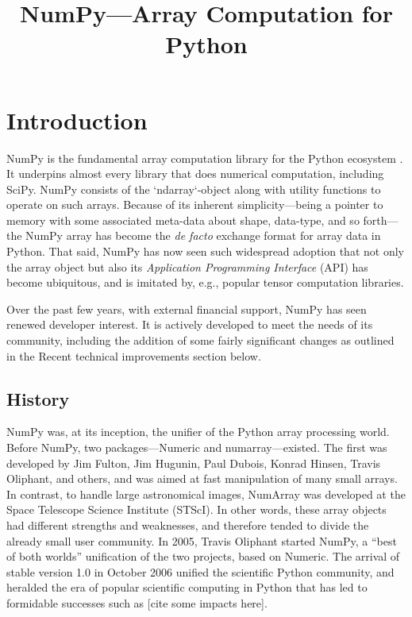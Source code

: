 \documentclass[fleqn,10pt]{wlscirep}
\title{NumPy---Array Computation for Python}
\begin{document}
\flushbottom
\maketitle
\thispagestyle{empty}



\section*{Introduction}

NumPy is the fundamental array computation library for the Python
ecosystem \cite{dubois2007guest,oliphant2007python,millman2011python,perez2011python}.
It underpins almost every library that does numerical
computation, including SciPy.  NumPy consists of the `ndarray`-object
along with utility functions to operate on such arrays.  Because of
its inherent simplicity—being a pointer to memory with some
associated meta-data about shape, data-type, and so forth—the NumPy
array has become the {\it de facto} exchange format for array data in
Python.  That said, NumPy has now seen such widespread adoption that
not only the array object but also its {\it Application Programming
  Interface} (API) has become ubiquitous, and is imitated by, e.g.,
popular tensor computation libraries.

Over the past few years, with external financial support, NumPy has
seen renewed developer interest.  It is actively developed to meet the
needs of its community, including the addition of some fairly significant
changes as outlined in the Recent technical improvements section below.

\subsection*{History}

NumPy was, at its inception, the unifier of the Python array
processing world.  Before NumPy, two packages—Numeric and
numarray—existed.  The first was developed by Jim Fulton, Jim Hugunin, Paul Dubois, Konrad
Hinsen, Travis Oliphant, and others, and was aimed at fast manipulation of many
small arrays.  In contrast, to handle large astronomical images,
NumArray was developed at the Space Telescope Science Institute (STScI).
In other words, these array
objects had different strengths and weaknesses, and therefore tended
to divide the already small user community.  In 2005, Travis Oliphant
started NumPy, a ``best of both worlds'' unification of the two
projects, based on Numeric.  The arrival of stable version 1.0 in October
2006 unified the scientific Python
community, and heralded the era of popular scientific computing in
Python that has led to formidable successes such as [cite some impacts here].
\end{document}
